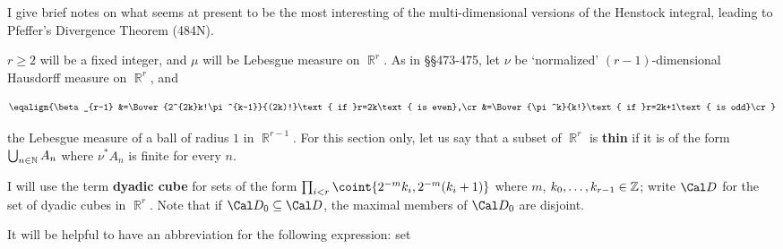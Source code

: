 
\def\varinnerprod#1#2{#1\dotproduct#2}

\def\chaptername{Gauge integrals}
\def\sectionname{The Pfeffer integral}


I give brief notes on what seems at present to be the most
interesting of the multi-dimensional versions of the Henstock integral,
leading to Pfeffer's Divergence Theorem (484N).

   $r\ge 2$ will be
a fixed integer, and $\mu$ will be Lebesgue measure on
$\BbbR^r$.   As in
\S\S473-475, let
$\nu$ be `normalized' $(r-1)$-dimensional Hausdorff measure on
$\BbbR^r$, and

$$\eqalign{\beta_{r-1}
&=\Bover{2^{2k}k!\pi^{k-1}}{(2k)!}\text{ if }r=2k\text{ is even},\cr
&=\Bover{\pi^k}{k!}\text{ if }r=2k+1\text{ is odd}\cr}$$

\noindent{} the Lebesgue measure of a ball of radius $1$ in
$\BbbR^{r-1}$.
For this section only, let us say that a subset of $\BbbR^r$ is {\bf
thin} if it is of the form $\bigcup_{n\in\Bbb N}A_n$ where $\nu^*A_n$ is
finite for every $n$.

I will use the term {\bf dyadic cube} for sets of the
form $\prod_{i<r}\coint{2^{-m}k_i,2^{-m}(k_i+1)}$ where $m$,
$k_0,\ldots,k_{r-1}\in\Bbb Z$;  write $\Cal D$ for the set of dyadic
cubes in $\BbbR^r$.   Note that if $\Cal D_0\subseteq\Cal D$, the
maximal members of $\Cal D_0$ are disjoint.

It will be helpful to have an abbreviation for the following expression:
set


